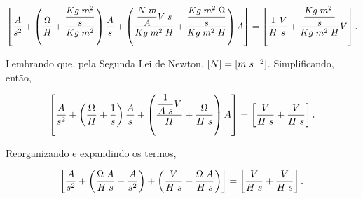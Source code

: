 \documentclass{article}
\numberwithin{equation}{section}
\let\l\left
\let\r\right
\let\dfr\dfrac
\begin{document}
\begin{equation*}
    \l[ \dfr{A}{s^2} + \l( \dfr{\Omega}{H} + \dfr{\dfr{Kg \hspace{1mm} m^2}{s}}{Kg \hspace{1mm} m^2} \r) \dfr{A}{s} + \l( \dfr{\dfr{N \hspace{1mm} m}{A} V \hspace{1mm} s}{Kg \hspace{1mm} m^2 \hspace{1mm} H} + \dfr{\dfr{Kg \hspace{1mm} m^2 \hspace{1mm} \Omega}{s}}{Kg \hspace{1mm} m^2 \hspace{1mm} H} \r)A \r] = \l[ \dfr{1}{H}\dfr{V}{s}  + \dfr{\dfr{Kg \hspace{1mm} m^2 \hspace{1mm}}{s}}{Kg \hspace{1mm} m^2 \hspace{1mm} H}V\r].
\end{equation*}

\noindent Lembrando que, pela Segunda Lei de Newton, $[N] = [m \hspace{1mm}s^{-2}]$. Simplificando, então,

\begin{equation*}
    \l[ \dfr{A}{s^2} + \l( \dfr{\Omega}{H} + \dfr{1}{s}\r)\dfr{A}{s} + \l( \dfr{\dfr{1}{A \hspace{1mm} s} V}{H} + \dfr{\Omega}{H \hspace{1mm} s} \r) A \r] = \l[ \dfr{V}{H \hspace{1mm} s}  + \dfr{V}{H \hspace{1mm} s}\r].
\end{equation*}

\noindent Reorganizando e expandindo os termos,

\begin{equation*}
    \l[ \dfr{A}{s^2} + \l( \dfr{\Omega \hspace{1mm} A}{H \hspace{1mm} s} + \dfr{A}{s^2}\r) + \l( \dfr{V}{H \hspace{1mm} s} + \dfr{\Omega \hspace{1mm} A}{H \hspace{1mm} s} \r) \r] = \l[ \dfr{V}{H \hspace{1mm} s}  + \dfr{V}{H \hspace{1mm} s}\r].
\end{equation*}
\end{document}
